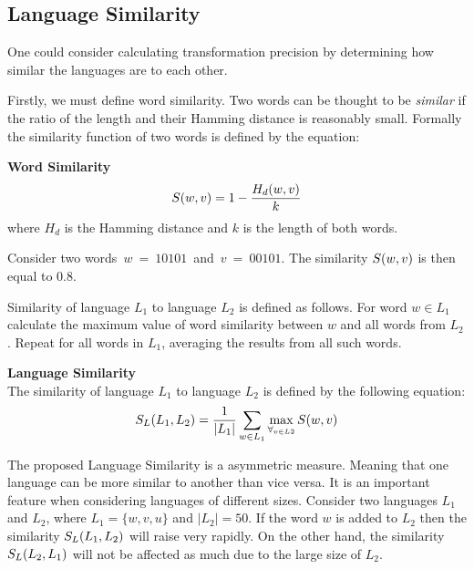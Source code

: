 \documentclass{mini}
\begin{document}
\subsection{Language Similarity}\label{sec:lan_theory_lan_sim}
One could consider calculating transformation precision by determining how similar the languages are to each other.

Firstly, we must define word similarity. Two words can be thought to be \textit{similar} if the ratio of the length and their Hamming distance is reasonably small. Formally the similarity function of two words is defined by the equation:

\begin{definition} {\bf Word Similarity}
    \begin{equation}
    S(w,v) = 1 - \frac{H_d(w,v)}{k}
    \end{equation}
    where $H_d$ is the Hamming distance and $k$ is the length of both words.
\end{definition}

Consider two words~$w~=~10101$~and~$v~=~00101$. The similarity $S(w,v)$ is then equal to $0.8$.

Similarity of language $L_{1}$ to language $L_{2}$ is defined as follows. For word $w \in L_{1}$ calculate the maximum value of word similarity between $w$ and all words from $L_{2}$. Repeat for all words in $L_{1}$, averaging the results from all such words.

\begin{definition} {\bf Language Similarity\\}
The similarity of language $L_{1}$ to language $L_{2}$ is defined by the following equation:
    \begin{equation}
    S_{L}(L_{1},L_{2}) = \frac{1}{|L_{1}|} \sum_{w \in L_{1}} \max_{\forall_{v \in L{2}}} S(w,v)
    \end{equation}

\end{definition}

The proposed Language Similarity is a asymmetric measure. Meaning that one language can be more similar to another than vice versa. It is an important feature when considering languages of different sizes. Consider two languages $L_{1}$ and $L_{2}$, where $L_{1} = \{w,v,u\}$ and $|L_{2}| = 50$.
If the word $w$ is added to $L_{2}$ then the similarity $S_{L}(L_1,L_2)$ will raise very rapidly. On the other hand, the similarity $S_{L}(L_2,L_1)$ will not be affected as much due to the large size of $L_{2}$.
\end{document}
